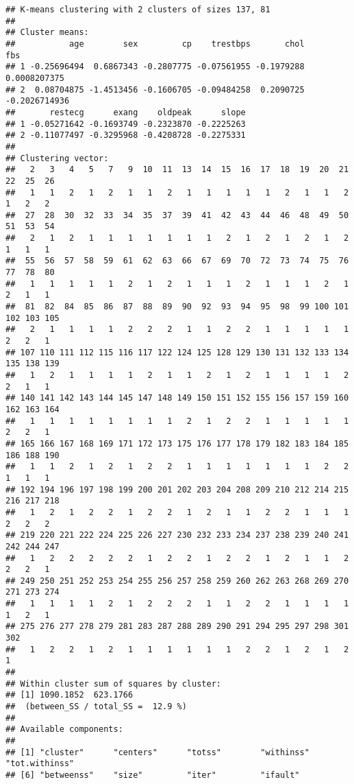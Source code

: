 \documentclass[
]{article}
\begin{document}
\begin{verbatim}
## K-means clustering with 2 clusters of sizes 137, 81
## 
## Cluster means:
##           age        sex         cp    trestbps       chol           fbs
## 1 -0.25696494  0.6867343 -0.2807775 -0.07561955 -0.1979288  0.0008207375
## 2  0.08704875 -1.4513456 -0.1606705 -0.09484258  0.2090725 -0.2026714936
##       restecg      exang    oldpeak      slope
## 1 -0.05271642 -0.1693749 -0.2323870 -0.2225263
## 2 -0.11077497 -0.3295968 -0.4208728 -0.2275331
## 
## Clustering vector:
##   2   3   4   5   7   9  10  11  13  14  15  16  17  18  19  20  21  22  25  26 
##   1   1   2   1   2   1   1   2   1   1   1   1   1   2   1   1   2   1   2   2 
##  27  28  30  32  33  34  35  37  39  41  42  43  44  46  48  49  50  51  53  54 
##   2   1   2   1   1   1   1   1   1   1   2   1   2   1   2   1   2   1   1   1 
##  55  56  57  58  59  61  62  63  66  67  69  70  72  73  74  75  76  77  78  80 
##   1   1   1   1   1   2   1   2   1   1   1   2   1   1   1   2   1   2   1   1 
##  81  82  84  85  86  87  88  89  90  92  93  94  95  98  99 100 101 102 103 105 
##   2   1   1   1   1   2   2   2   1   1   2   2   1   1   1   1   1   2   2   1 
## 107 110 111 112 115 116 117 122 124 125 128 129 130 131 132 133 134 135 138 139 
##   1   2   1   1   1   1   2   1   1   2   1   2   1   1   1   1   2   2   1   1 
## 140 141 142 143 144 145 147 148 149 150 151 152 155 156 157 159 160 162 163 164 
##   1   1   1   1   1   1   1   1   2   1   2   2   1   1   1   1   1   2   2   1 
## 165 166 167 168 169 171 172 173 175 176 177 178 179 182 183 184 185 186 188 190 
##   1   1   2   1   2   1   2   2   1   1   1   1   1   1   1   2   2   1   1   1 
## 192 194 196 197 198 199 200 201 202 203 204 208 209 210 212 214 215 216 217 218 
##   1   2   1   2   2   1   2   2   1   2   1   1   2   2   1   1   1   2   2   2 
## 219 220 221 222 224 225 226 227 230 232 233 234 237 238 239 240 241 242 244 247 
##   1   2   2   2   2   2   1   2   2   1   2   2   1   2   1   1   2   2   2   1 
## 249 250 251 252 253 254 255 256 257 258 259 260 262 263 268 269 270 271 273 274 
##   1   1   1   1   2   1   2   2   2   1   1   2   2   1   1   1   1   1   2   1 
## 275 276 277 278 279 281 283 287 288 289 290 291 294 295 297 298 301 302 
##   1   2   2   1   2   1   1   1   1   1   1   2   2   1   2   1   2   1 
## 
## Within cluster sum of squares by cluster:
## [1] 1090.1852  623.1766
##  (between_SS / total_SS =  12.9 %)
## 
## Available components:
## 
## [1] "cluster"      "centers"      "totss"        "withinss"     "tot.withinss"
## [6] "betweenss"    "size"         "iter"         "ifault"
\end{verbatim}
\end{document}
